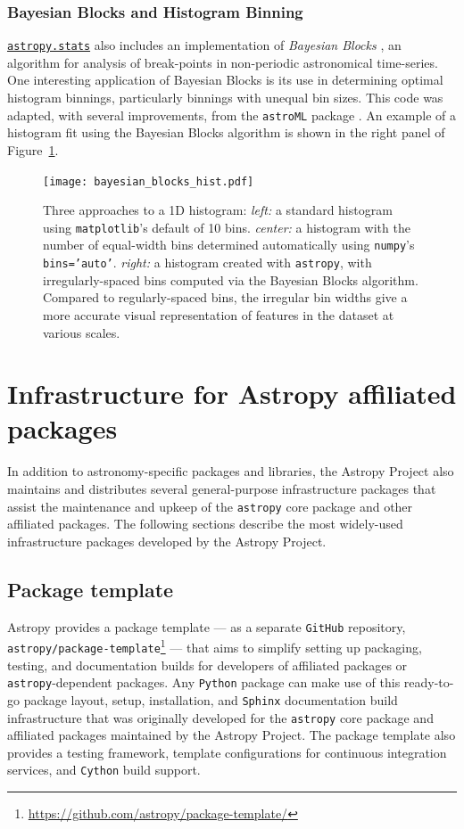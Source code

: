 \documentclass[modern]{aastex62}
\newcommand{\package}[1]{\texttt{#1}\xspace}
\newcommand{\github}{\package{GitHub}}
\newcommand{\python}{\package{Python}}
\newcommand{\astropy}{Astropy\xspace}
\newcommand{\astropypkg}{\package{astropy}}
\renewcommand{\figurename}{Figure\xspace}
\newcommand{\astropysubpkg}[1]{\href{http://docs.astropy.org/en/stable/#1/index.html}{\texttt{astropy.#1}}\xspace}
\begin{document}
\subsubsection{Bayesian Blocks and Histogram Binning}
\astropysubpkg{stats} also includes an implementation of
{\it Bayesian Blocks} \citep{Scargle2013}, an algorithm for analysis of
break-points in non-periodic astronomical time-series. One interesting
application of Bayesian Blocks is its use in determining optimal histogram
binnings, particularly binnings with unequal bin sizes.
This code was adapted, with several improvements, from the \package{astroML}
package \citep{astroML}. An example of a histogram fit using the Bayesian
Blocks algorithm is shown in the right panel of
\figurename~\ref{fig:bayes-blocks-hist}.

\begin{figure}
\texttt{[image: bayesian\_blocks\_hist.pdf]}
\caption{%
    Three approaches to a 1D histogram:
    {\it left:} a standard histogram using \package{matplotlib}'s default of 10 bins.
    {\it center:} a histogram with the number of equal-width bins determined automatically using \package{numpy}'s {\tt bins='auto'}.
    {\it right:} a histogram created with \astropypkg, with irregularly-spaced bins computed via the Bayesian Blocks algorithm.
    Compared to regularly-spaced bins, the irregular bin widths give a more accurate visual representation of features in the dataset at various scales.
    \label{fig:bayes-blocks-hist}
}
\end{figure}

\section{Infrastructure for Astropy affiliated packages}

\label{sec:infrastructure}

In addition to astronomy-specific packages and libraries, the \astropy Project
also maintains and distributes several general-purpose infrastructure packages
that assist the maintenance and upkeep of the \astropypkg core package and
other affiliated packages.
The following sections describe the most widely-used infrastructure packages
developed by the \astropy Project.

\subsection{Package template}

\astropy provides a package template --- as a separate \github repository,
\package{astropy/package-template}\footnote{\url{https://github.com/astropy/package-template/}}
--- that aims to simplify setting up packaging, testing, and
documentation builds for developers of affiliated packages or
\astropypkg-dependent packages.
Any \python package can make use of this ready-to-go package layout, setup,
installation, and \package{Sphinx} documentation build infrastructure that was
originally developed for the \astropypkg core package and affiliated packages
maintained by the \astropy Project.
The package template also provides a testing framework, template configurations
for continuous integration services, and \package{Cython} build support.
\end{document}
